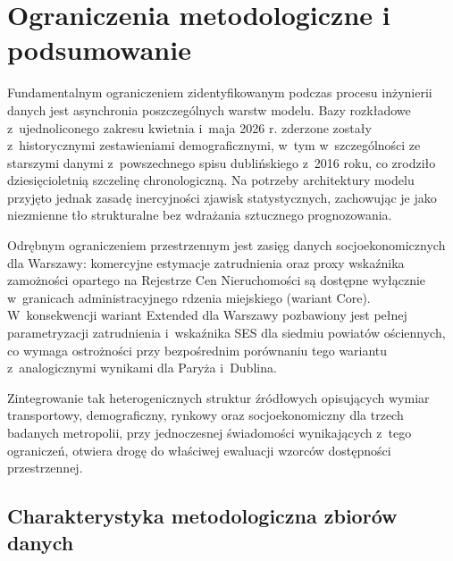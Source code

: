 \documentclass{pracamgr}
\begin{document}
\clearpage

\section{Ograniczenia metodologiczne i podsumowanie}

Fundamentalnym ograniczeniem zidentyfikowanym podczas procesu inżynierii danych jest asynchronia poszczególnych warstw modelu. Bazy rozkładowe z~ujednoliconego zakresu kwietnia i~maja 2026 r. zderzone zostały z~historycznymi zestawieniami demograficznymi, w~tym w~szczególności ze starszymi danymi z~powszechnego spisu dublińskiego z~2016 roku, co zrodziło dziesięcioletnią szczelinę chronologiczną. Na potrzeby architektury modelu przyjęto jednak zasadę inercyjności zjawisk statystycznych, zachowując je jako niezmienne tło strukturalne bez wdrażania sztucznego prognozowania.

Odrębnym ograniczeniem przestrzennym jest zasięg danych socjoekonomicznych dla Warszawy: komercyjne estymacje zatrudnienia oraz proxy wskaźnika zamożności opartego na Rejestrze Cen Nieruchomości są dostępne wyłącznie w~granicach administracyjnego rdzenia miejskiego (wariant Core). W~konsekwencji wariant Extended dla Warszawy pozbawiony jest pełnej parametryzacji zatrudnienia i~wskaźnika SES dla siedmiu powiatów ościennych, co wymaga ostrożności przy bezpośrednim porównaniu tego wariantu z~analogicznymi wynikami dla Paryża i~Dublina.

Zintegrowanie tak heterogenicznych struktur źródłowych opisujących wymiar transportowy, demograficzny, rynkowy oraz socjoekonomiczny dla trzech badanych metropolii, przy jednoczesnej świadomości wynikających z~tego ograniczeń, otwiera drogę do właściwej ewaluacji wzorców dostępności przestrzennej.

\subsection*{Charakterystyka metodologiczna zbiorów danych}

\begingroup
\footnotesize
\renewcommand{\arraystretch}{1.4}
\setlength{\tabcolsep}{4pt}

\setlength{\LTleft}{-0.7cm}
\setlength{\LTright}{-0.7cm}
\end{document}

